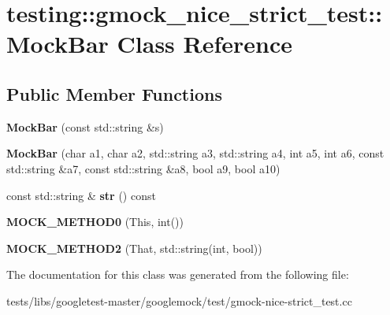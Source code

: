 \hypertarget{classtesting_1_1gmock__nice__strict__test_1_1MockBar}{}\section{testing\+:\+:gmock\+\_\+nice\+\_\+strict\+\_\+test\+:\+:Mock\+Bar Class Reference}
\label{classtesting_1_1gmock__nice__strict__test_1_1MockBar}
\subsection*{Public Member Functions}
\begin{DoxyCompactItemize}
\item 
\mbox{\label{classtesting_1_1gmock__nice__strict__test_1_1MockBar_abd4e7936dc389201ce608257f7a02584}} 
{\bfseries Mock\+Bar} (const std\+::string \&s)
\item 
\mbox{\label{classtesting_1_1gmock__nice__strict__test_1_1MockBar_ad6b73066fdcdd71ac1add73ef56b53ef}} 
{\bfseries Mock\+Bar} (char a1, char a2, std\+::string a3, std\+::string a4, int a5, int a6, const std\+::string \&a7, const std\+::string \&a8, bool a9, bool a10)
\item 
\mbox{\label{classtesting_1_1gmock__nice__strict__test_1_1MockBar_adc0fb56c042e95e1a459bb007e813169}} 
const std\+::string \& {\bfseries str} () const
\item 
\mbox{\label{classtesting_1_1gmock__nice__strict__test_1_1MockBar_a9aad688c2b1dc6b529b7c499e49e3a70}} 
{\bfseries M\+O\+C\+K\+\_\+\+M\+E\+T\+H\+O\+D0} (This, int())
\item 
\mbox{\label{classtesting_1_1gmock__nice__strict__test_1_1MockBar_afa41d45dd7066f014f755f152ec16a73}} 
{\bfseries M\+O\+C\+K\+\_\+\+M\+E\+T\+H\+O\+D2} (That, std\+::string(int, bool))
\end{DoxyCompactItemize}


The documentation for this class was generated from the following file\+:\begin{DoxyCompactItemize}
\item 
tests/libs/googletest-\/master/googlemock/test/gmock-\/nice-\/strict\+\_\+test.\+cc\end{DoxyCompactItemize}
